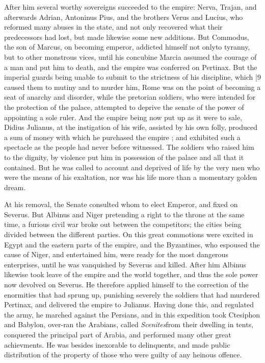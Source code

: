 After him several worthy sovereigns succeeded to the empire: Nerva, Trajan, and afterwards Adrian, Antoninus Pius, and the brothers Verus and Lucius, who reformed many abuses in the state, and not only recovered what their predecessors had lost, but made likewise some new additions. But Commodus, the son of Marcus, on becoming emperor, addicted himself not only\emph{}to tyranny, but to other monstrous vices, until his concubine Marcia assumed the courage of a man and put him to death, and the empire was conferred on Pertinax. But the imperial guards being unable to submit to the strictness of his discipline, which
|9 caused them to mutiny and to murder him, Rome was on the point of becoming a seat of anarchy and disorder, while the pretorian soldiers, who were intended for the protection of the palace, attempted to deprive the senate of the power of appointing a sole ruler. And the empire being now put up as it were to sale, Didius Julianus, at the instigation of his wife, assisted by his own folly, produced a sum of money with which he purchased the empire ; and exhibited such a spectacle as the people had never before witnessed. The soldiers who raised him to the dignity, by violence put him in possession of the palace and all that it contained. But he was called to account and deprived of life by the very men who were the means of his exaltation, nor was his life more than a momentary golden dream.

At his removal, the Senate consulted whom to elect Emperor, and fixed on Severus. But Albinus and Niger pretending a right to the throne at the same time, a furious civil war broke out between the competitors; the cities being divided between the different parties. On this great commotions were excited in Egypt and the eastern parts of the empire, and the Byzantines, who espoused the cause of Niger, and entertained him, were ready for the most dangerous enterprises, until he was vanquished by Severus and killed. After him Albinus likewise took leave of the empire and the world together, and thus the sole power now devolved on Severus. He therefore applied himself to the correction of the enormities that had sprung up, punishing severely the soldiers that had murdered Pertinax, and delivered the empire to Julianus. Having done this, and regulated the army, he marched against the Persians, and in this expedition took Ctesiphon and Babylon, over-ran the Arabians, called \emph{Scenites}from their dwelling in tents, conquered the principal part of Arabia, and performed many other great achievments. He was besides inexorable to delinquents, and made public distribution of the property of those who were guilty of any heinous offence.

